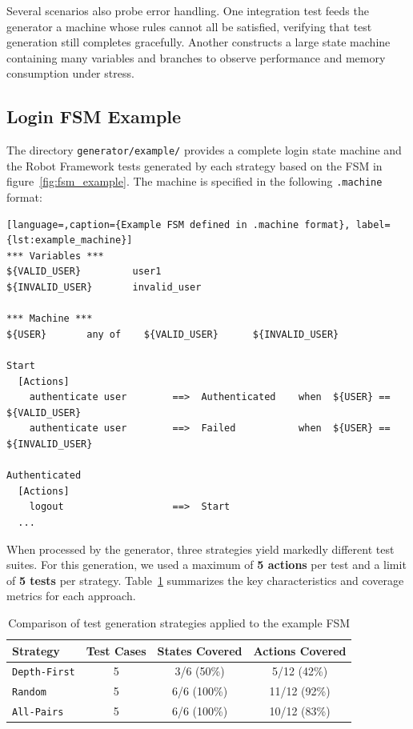 Several scenarios also probe error handling. One integration test feeds the
generator a machine whose rules cannot all be satisfied, verifying that test
generation still completes gracefully. Another constructs a large state machine
containing many variables and branches to observe performance and memory
consumption under stress. 

\subsection{Login FSM Example}

The directory \texttt{generator/example/} provides a complete login state
machine and the Robot Framework tests generated by each strategy based on the FSM in figure~\ref{fig:fsm_example}.  The machine is
specified in the following \texttt{.machine} format:
\begin{lstlisting}[language=,caption={Example FSM defined in .machine format}, label={lst:example_machine}]
*** Variables ***
${VALID_USER}         user1
${INVALID_USER}       invalid_user

*** Machine ***
${USER}       any of    ${VALID_USER}      ${INVALID_USER}

Start
  [Actions]
    authenticate user        ==>  Authenticated    when  ${USER} == ${VALID_USER}
    authenticate user        ==>  Failed           when  ${USER} == ${INVALID_USER}

Authenticated
  [Actions]
    logout                   ==>  Start
  ...
\end{lstlisting}
When processed by the generator, three strategies yield markedly different test
suites. For this generation, we used a maximum of \textbf{5 actions} per test and a limit
of \textbf{5 tests} per strategy. Table~\ref{tab:strategy_comparison} summarizes the key characteristics
and coverage metrics for each approach.

\begin{table}[ht]
\centering
\caption{Comparison of test generation strategies applied to the example FSM}
\label{tab:strategy_comparison}
\begin{tabular}{|l|c|c|c|}
\hline
    \textbf{Strategy} & \textbf{Test Cases} & \textbf{States Covered} & \textbf{Actions Covered} \\
\hline
\texttt{Depth-First} & 5 & 3/6 (50\%) & 5/12 (42\%) \\
\hline
\texttt{Random} & 5 & 6/6 (100\%) & 11/12 (92\%) \\
\hline
\texttt{All-Pairs} & 5 & 6/6 (100\%) & 10/12 (83\%) \\
\hline
\end{tabular}
\end{table}

